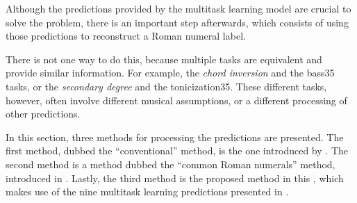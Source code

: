 
Although the predictions provided by the multitask learning
model are crucial to solve the problem, there is an
important step afterwards, which consists of using those
predictions to reconstruct a Roman numeral label.

There is not one way to do this, because multiple tasks are
equivalent and provide similar information. For example, the
\emph{chord inversion} and the \gls{bass35} tasks, or the
\emph{secondary degree} and the \gls{tonicization35}. These
different tasks, however, often involve different musical
assumptions, or a different processing of other predictions.

In this section, three methods for processing the
predictions are presented. The first method, dubbed the
``conventional'' method, is the one introduced by
\textcite{chen2018functional}. The second method is a method
dubbed the ``common Roman numerals'' method, introduced in
\textcite{napoleslopez2021augmentednet}. Lastly, the third
method is the proposed method in this \thesisdiss{}, which
makes use of the nine multitask learning predictions
presented in .

